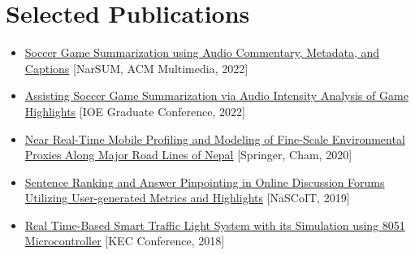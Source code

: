 \documentclass{resume}
\begin{document}
\section{Selected Publications}
\begin{itemize}
   
 \item {\href{https://dl.acm.org/doi/10.1145/3552463.3557019}{Soccer Game Summarization using Audio Commentary, Metadata, and Captions}}
[NarSUM, ACM Multimedia, 2022]


 \item {\href{https://www.researchgate.net/publication/363737872_Assisting_Soccer_Game_Summarization_via_Audio_Intensity_Analysis_of_Game_Highlights}{Assisting Soccer Game Summarization via Audio Intensity Analysis of Game Highlights}}
[IOE Graduate Conference, 2022]

 \item {\href{https://www.researchgate.net/publication/347751604_Near_Real-Time_Mobile_Profiling_and_Modeling_of_Fine-Scale_Environmental_Proxies_Along_Major_Road_Lines_of_Nepal}{Near Real-Time Mobile Profiling and Modeling of Fine-Scale Environmental Proxies Along Major Road Lines of Nepal}}
[Springer, Cham, 2020]

 \item {\href{https://www.researchgate.net/publication/330041750_Sentence_Ranking_and_Answer_Pinpointing_in_Online_Discussion_Forums_Utilising_User-generated_Metrics_and_Highlights}{Sentence Ranking and Answer Pinpointing in Online Discussion Forums Utilizing User-generated Metrics and Highlights}}
[NaSCoIT, 2019]

 \item {\href{https://www.researchgate.net/publication/328043517_Real_Time-Based_Smart_Traffic_Light_System_with_its_Simulation_using_8051_Microcontroller}{Real Time-Based Smart Traffic Light System with its Simulation using 8051 Microcontroller}}
[KEC Conference, 2018]

\end{itemize}
\end{document}
